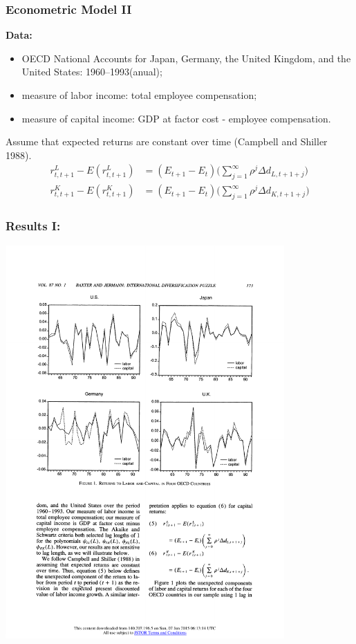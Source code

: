 \documentclass[10pt]{beamer}
\begin{document}
\begin{frame}[c]\frametitle{Econometric Model II}
\textbf{Data:}
\begin{itemize}
    \item OECD National Accounts for Japan, Germany, the United Kingdom, and the United States: 1960--1993(anual);
    \item  measure of labor income: total employee compensation;
    \item measure of capital income: GDP at factor cost - employee compensation.
\end{itemize}
Assume that expected returns are constant over time (Campbell and Shiller 1988).
\begin{align}
    r_{t,t+1}^{L} - E(r_{t,t+1}^{L}) &= (E_{t+1}-E_{t})\big(\sum_{j=1}^{\infty} \rho^{j}\Delta d_{L,t+1+j}\big)\\
    r_{t,t+1}^{K} - E(r_{t,t+1}^{K}) &= (E_{t+1}-E_{t})\big(\sum_{j=1}^{\infty} \rho^{j}\Delta d_{K,t+1+j}\big)
\end{align}

\end{frame}

\begin{frame}[c]\frametitle{Results I:}

\begin{center}
\includegraphics[width=0.8\textwidth]{figure1.pdf}
\end{center}

\end{frame}
\end{document}
